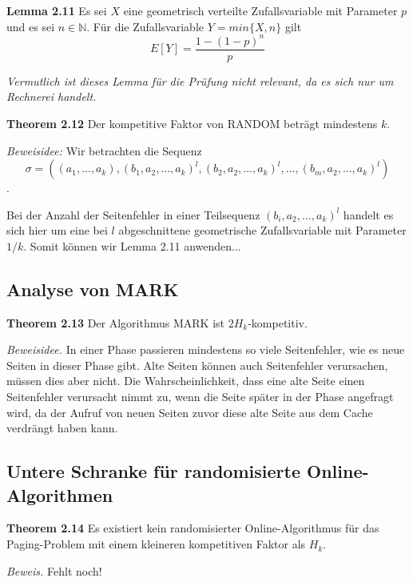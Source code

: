 \textbf{Lemma 2.11} Es sei $X$ eine geometrisch verteilte Zufallsvariable mit Parameter $p$ und es sei $n \in \mathbb{N}$. Für die Zufallsvariable $Y = min\{X,n\}$ gilt $$E[Y] = \frac{1-(1-p)^n}{p}$$

\textit{Vermutlich ist dieses Lemma für die Prüfung nicht relevant, da es sich nur um Rechnerei handelt.}



\textbf{Theorem 2.12} Der kompetitive Faktor von RANDOM beträgt mindestens $k$.

\textit{Beweisidee:} Wir betrachten die Sequenz $$\sigma = \left((a_1,...,a_k),(b_1,a_2,...,a_k)^l,(b_2,a_2,...,a_k)^l,...,(b_m,a_2,...,a_k)^l\right)$$.

Bei der Anzahl der Seitenfehler in einer Teilsequenz $(b_i,a_2,...,a_k)^l$ handelt es sich hier um eine bei $l$ abgeschnittene geometrische Zufallsvariable mit Parameter $1/k$. Somit können wir Lemma 2.11 anwenden...


\subsection{Analyse von MARK}

\textbf{Theorem 2.13} Der Algorithmus MARK ist $2H_k$-kompetitiv.

\textit{Beweisidee.} In einer Phase passieren mindestens so viele Seitenfehler, wie es neue Seiten in dieser Phase gibt. Alte Seiten können auch Seitenfehler verursachen, müssen dies aber nicht. Die Wahrscheinlichkeit, dass eine alte Seite einen Seitenfehler verursacht nimmt zu, wenn die Seite später in der Phase angefragt wird, da der Aufruf von neuen Seiten zuvor diese alte Seite aus dem Cache verdrängt haben kann.

\subsection{Untere Schranke für randomisierte Online-Algorithmen}

\textbf{Theorem 2.14} Es existiert kein randomisierter Online-Algorithmus für das Paging-Problem mit einem kleineren kompetitiven Faktor als $H_k$.

\textit{Beweis.} Fehlt noch!
